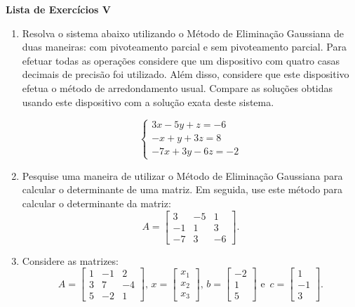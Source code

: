 \documentclass[12pt,a4paper]{article}
\begin{document}
\begin{center}
 \textbf{Lista de Exercícios V}
\end{center}

% 

\begin{enumerate}
  
  \item Resolva o sistema abaixo utilizando o Método de Eliminação Gaussiana de duas maneiras: com pivoteamento parcial e sem pivoteamento parcial. Para efetuar todas as operações considere que um dispositivo 
com quatro casas decimais de precisão foi utilizado. Além disso, considere que este dispositivo efetua o método de arredondamento usual. Compare as 
soluções obtidas usando este dispositivo com a solução exata deste sistema.

  $$%
   \begin{cases}
    3x - 5y + z = -6 \\
    -x + y + 3z = 8 \\
    -7x + 3y - 6z = -2
   \end{cases}
  $$

  \item Pesquise uma maneira de utilizar o Método de Eliminação Gaussiana para calcular o determinante de uma matriz. Em seguida, use este método para calcular 
o determinante da matriz:
$$A=\begin{bmatrix}3 & - 5 & 1 \\ -1 & 1 & 3 \\ -7 & 3 & -6\end{bmatrix}.$$

  \item Considere as matrizes:
$$A=\begin{bmatrix}1 & - 1 & 2 \\ 3 & 7 & -4 \\ 5 & -2 & 1\end{bmatrix}, \, 
x=\begin{bmatrix}x_1 \\ x_2 \\ x_3\end{bmatrix}, \, 
b=\begin{bmatrix}-2 \\ 1 \\ 5\end{bmatrix} \textrm{ e }\,
c=\begin{bmatrix}1 \\ -1 \\ 3\end{bmatrix}. 
$$


\end{enumerate}
\end{document}
